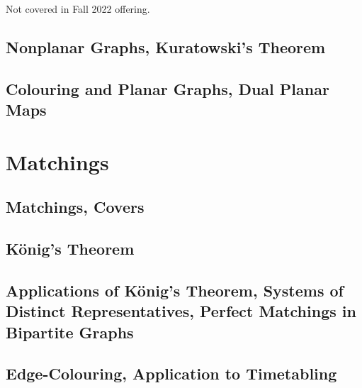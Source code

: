 \documentclass[class=math239,notes,tikz]{agony}
\begin{document}
Not covered in Fall 2022 offering.

\setcounter{subsection}{5}
\subsection{Nonplanar Graphs, Kuratowski's Theorem}

\setcounter{subsection}{7}
\subsection{Colouring and Planar Graphs, Dual Planar Maps}

\section{Matchings}

\setcounter{subsection}{1}
\subsection{Matchings, Covers}

\subsection{K\"onig's Theorem}

\setcounter{subsection}{5}
\subsection{Applications of K\"onig's Theorem, Systems of Distinct Representatives, Perfect Matchings in Bipartite Graphs}

\setcounter{subsection}{7}
\subsection{Edge-Colouring, Application to Timetabling}
\end{document}
